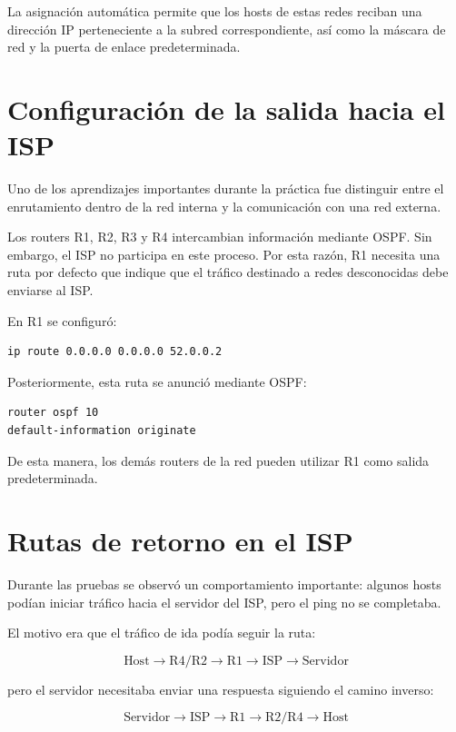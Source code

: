 \documentclass[12pt,a4paper]{article}
\begin{document}
La asignación automática permite que los hosts de estas redes reciban una dirección IP perteneciente a la subred correspondiente, así como la máscara de red y la puerta de enlace predeterminada.

\section{Configuración de la salida hacia el ISP}

Uno de los aprendizajes importantes durante la práctica fue distinguir entre el enrutamiento dentro de la red interna y la comunicación con una red externa.

Los routers R1, R2, R3 y R4 intercambian información mediante OSPF. Sin embargo, el ISP no participa en este proceso. Por esta razón, R1 necesita una ruta por defecto que indique que el tráfico destinado a redes desconocidas debe enviarse al ISP.

En R1 se configuró:

\begin{lstlisting}[style=cisco]
ip route 0.0.0.0 0.0.0.0 52.0.0.2
\end{lstlisting}

Posteriormente, esta ruta se anunció mediante OSPF:

\begin{lstlisting}[style=cisco]
router ospf 10
default-information originate
\end{lstlisting}

De esta manera, los demás routers de la red pueden utilizar R1 como salida predeterminada.

\section{Rutas de retorno en el ISP}

Durante las pruebas se observó un comportamiento importante: algunos hosts podían iniciar tráfico hacia el servidor del ISP, pero el ping no se completaba.

El motivo era que el tráfico de ida podía seguir la ruta:

$$
\text{Host} \rightarrow \text{R4/R2} \rightarrow \text{R1} \rightarrow
\text{ISP} \rightarrow \text{Servidor}
$$

pero el servidor necesitaba enviar una respuesta siguiendo el camino inverso:

$$
\text{Servidor} \rightarrow \text{ISP} \rightarrow \text{R1}
\rightarrow \text{R2/R4} \rightarrow \text{Host}
$$
\end{document}
